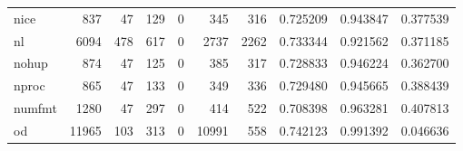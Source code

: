 \begin{longtable}{lrrrrrrrrr}
nice      &                                 837 &                                              47 &                                            129 &                                             0 &                                            345 &                                          316 &                                           0.725209 &                               0.943847 &                             0.377539 \\
nl        &                                6094 &                                             478 &                                            617 &                                             0 &                                           2737 &                                         2262 &                                           0.733344 &                               0.921562 &                             0.371185 \\
nohup     &                                 874 &                                              47 &                                            125 &                                             0 &                                            385 &                                          317 &                                           0.728833 &                               0.946224 &                             0.362700 \\
nproc     &                                 865 &                                              47 &                                            133 &                                             0 &                                            349 &                                          336 &                                           0.729480 &                               0.945665 &                             0.388439 \\
numfmt    &                                1280 &                                              47 &                                            297 &                                             0 &                                            414 &                                          522 &                                           0.708398 &                               0.963281 &                             0.407813 \\
od        &                               11965 &                                             103 &                                            313 &                                             0 &                                          10991 &                                          558 &                                           0.742123 &                               0.991392 &                             0.046636 \\

\end{longtable}
